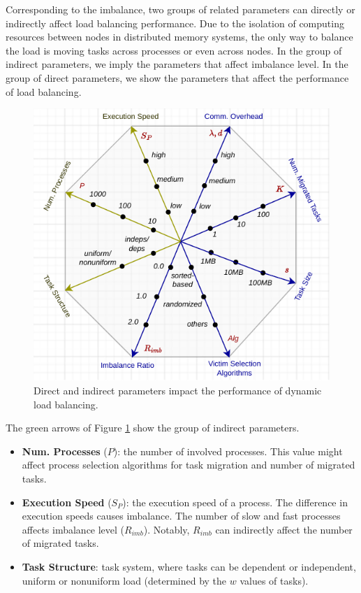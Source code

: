 Corresponding to the imbalance, two groups of related parameters can directly or indirectly affect load balancing performance. Due to the isolation of computing resources between nodes in distributed memory systems, the only way to balance the load is moving tasks across processes or even across nodes. In the group of indirect parameters, we imply the parameters that affect imbalance level. In the group of direct parameters, we show the parameters that affect the performance of load balancing.\\

\begin{figure}[t]
	\centering
	\includegraphics[scale=0.9]{./pictures/preliminaries/preli_vectorspace_influparams.pdf}
	\caption{Direct and indirect parameters impact the performance of dynamic load balancing.}
	\label{fig:preli_params_vector_space}
\end{figure}

The green arrows of Figure \ref{fig:preli_params_vector_space} show the group of indirect parameters.
\begin{itemize}
	\item \textbf{Num. Processes} ($P$): the number of involved processes. This value might affect process selection algorithms for task migration and number of migrated tasks.
	\item \textbf{Execution Speed} ($S_{P}$): the execution speed of a process. The difference in execution speeds causes imbalance. The number of slow and fast processes affects imbalance level ($R_{imb}$). Notably, $R_{imb}$ can indirectly affect the number of migrated tasks.
	\item \textbf{Task Structure}: task system, where tasks can be dependent or independent, uniform or nonuniform load (determined by the $w$ values of tasks).
\end{itemize}

